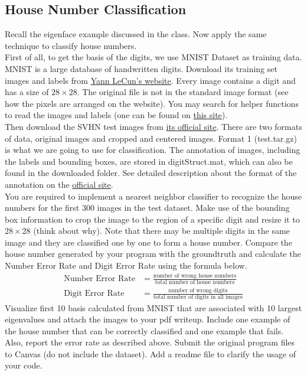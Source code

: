 \subsection{House Number Classification}
Recall the eigenface example discussed in the class. Now apply the same technique to classify house numbers.\\
First of all, to get the basis of the digits, we use MNIST Dataset as training data.
MNIST is a large database of handwritten digits.
Download its training set images and labels from \href{http://yann.lecun.com/exdb/mnist/}{Yann LeCun's website}.
Every image contains a digit and has a size of \(28 \times 28\).
The original file is not in the standard image format (see how the pixels are arranged on the website).
You may search for helper functions to read the images and labels (one can be found on \href{http://ufldl.stanford.edu/wiki/index.php/Using_the_MNIST_Dataset}{this site}).\\
Then download the SVHN test images from \href{http://ufldl.stanford.edu/housenumbers/}{its official site}.
There are two formats of data, original images and cropped and centered images.
Format 1 (test.tar.gz) is what we are going to use for classification.
The annotation of images, including the labels and bounding boxes, are stored in digitStruct.mat, which can also be found in the downloaded folder.
See detailed description
about the format of the annotation on the \href{http://ufldl.stanford.edu/housenumbers/}{official site}.\\
You are required to implement a nearest neighbor classifier to recognize the house numbers for the first 300 images in the test dataset.
Make use of the bounding box information to crop the image to the region of a specific digit and resize it to \(28 \times 28\) (think about why).
Note that there may be multiple digits in the same image and they are classified one by one to form a house number.
Compare the house number generated by your program with the groundtruth and calculate the Number Error Rate and Digit Error Rate using the formula below.
\begin{align*}
	\text{Number Error Rate}
	&=\frac{\text{number of wrong house numbers}}{\text{total number of house numbers}}\\
	\text{Digit Error Rate}
	&=\frac{\text{number of wrong digits}}{\text{total number of digits in all images}}
\end{align*}
Visualize first 10 basis calculated from MNIST that are associated with 10 largest eigenvalues and attach the images to your pdf writeup.
Include one example of the house number that can be correctly classified and one example that fails.
Also, report the error rate as described above.
Submit the original program files to Canvas (do not include the dataset).
Add a readme file to clarify the usage of your code.

